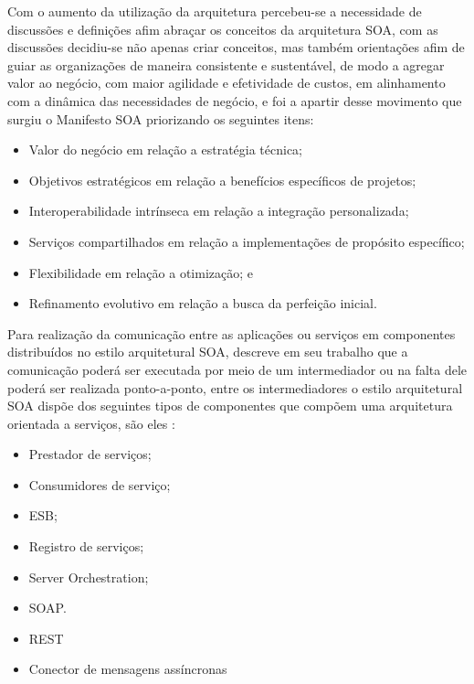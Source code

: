 Com o aumento da utilização da arquitetura percebeu-se a necessidade de discussões e definições afim abraçar os conceitos da arquitetura \acrshort{SOA}, com as discussões decidiu-se não apenas criar conceitos, mas também orientações  afim  de guiar as organizações de maneira consistente e sustentável, de modo a agregar valor ao negócio, com maior agilidade e efetividade de custos, em alinhamento com a dinâmica das necessidades de negócio, e foi a apartir desse movimento que surgiu o Manifesto \acrshort{SOA} \cite{erl2009soa} priorizando os seguintes itens:

\begin{itemize}

\item Valor do negócio em relação a estratégia técnica;

\item Objetivos estratégicos em relação a benefícios específicos de projetos;

\item Interoperabilidade intrínseca em relação a integração personalizada;

\item Serviços compartilhados em relação a implementações de propósito específico;

\item Flexibilidade em relação a otimização; e

\item Refinamento evolutivo em relação a busca da perfeição inicial.

\end{itemize}

Para realização da comunicação entre as aplicações ou serviços em componentes distribuídos no estilo arquitetural \acrshort{SOA}, \cite{clements2002documenting} descreve em seu trabalho que a comunicação poderá ser executada por meio de um intermediador ou na falta dele poderá ser realizada ponto-a-ponto, entre os intermediadores o estilo arquitetural \acrshort{SOA} dispõe dos seguintes tipos de componentes que compõem uma arquitetura orientada a serviços, são eles \cite{bass2003software}:

\begin{itemize}

\item Prestador de serviços;

\item Consumidores de serviço;

\item \acrfull{ESB};

\item Registro de serviços;

\item Server Orchestration; 

\item \acrfull{SOAP}.

\item \acrfull{REST}

\item Conector de mensagens assíncronas

\end{itemize}

